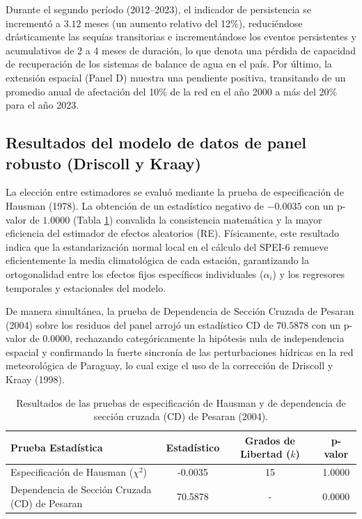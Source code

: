 \documentclass[11pt,a4paper]{article}
\begin{document}
Durante el segundo período (2012--2023), el indicador de persistencia se incrementó a $3.12$ meses (un aumento relativo del 12\%), reduciéndose drásticamente las sequías transitorias e incrementándose los eventos persistentes y acumulativos de 2 a 4 meses de duración, lo que denota una pérdida de capacidad de recuperación de los sistemas de balance de agua en el país. Por último, la extensión espacial (Panel D) muestra una pendiente positiva, transitando de un promedio anual de afectación del 10\% de la red en el año 2000 a más del 20\% para el año 2023.

\subsection{Resultados del modelo de datos de panel robusto (Driscoll y Kraay)}

La elección entre estimadores se evaluó mediante la prueba de especificación de Hausman (1978). La obtención de un estadístico negativo de $-0.0035$ con un p-valor de $1.0000$ (Tabla \ref{tab:hausman_pesaran}) convalida la consistencia matemática y la mayor eficiencia del estimador de efectos aleatorios (RE). Físicamente, este resultado indica que la estandarización normal local en el cálculo del SPEI-6 remueve eficientemente la media climatológica de cada estación, garantizando la ortogonalidad entre los efectos fijos específicos individuales ($\alpha_i$) y los regresores temporales y estacionales del modelo. 

De manera simultánea, la prueba de Dependencia de Sección Cruzada de Pesaran (2004) sobre los residuos del panel arrojó un estadístico CD de $70.5878$ con un p-valor de $0.0000$, rechazando categóricamente la hipótesis nula de independencia espacial y confirmando la fuerte sincronía de las perturbaciones hídricas en la red meteorológica de Paraguay, lo cual exige el uso de la corrección de Driscoll y Kraay (1998).

\begin{table}[ht!]
\centering
\begin{threeparttable}
\caption{Resultados de las pruebas de especificación de Hausman y de dependencia de sección cruzada (CD) de Pesaran (2004).}
\label{tab:hausman_pesaran}
\vspace{-0.6cm}
\singlespacing
\small
\begin{tabular}{p{5.2cm}c c c}
\hline\hline
\textbf{Prueba Estadística} & \textbf{Estadístico} & \textbf{Grados de Libertad ($k$)} & \textbf{p-valor} \\
\hline
Especificación de Hausman ($\chi^2$) & -0.0035 & 15 & 1.0000 \\
Dependencia de Sección Cruzada (CD) de Pesaran & 70.5878 & - & 0.0000 \\
\hline\hline
\end{tabular}
\end{threeparttable}
\end{table}
\end{document}

